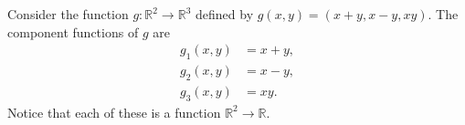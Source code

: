\documentclass{ximera}
\begin{document}
\begin{example}
Consider the function $g:\mathbb{R}^2\rightarrow\mathbb{R}^3$ defined by $g(x,y) = (x+y, x-y, xy)$. The component functions of $g$ are
\begin{align*}
g_1(x,y) &= x+y,\\
g_2(x,y) &= x-y,\\
g_3(x,y) &= xy.
\end{align*}
Notice that each of these is a function $\mathbb{R}^2\rightarrow\mathbb{R}$.
\end{example}
\end{document}
